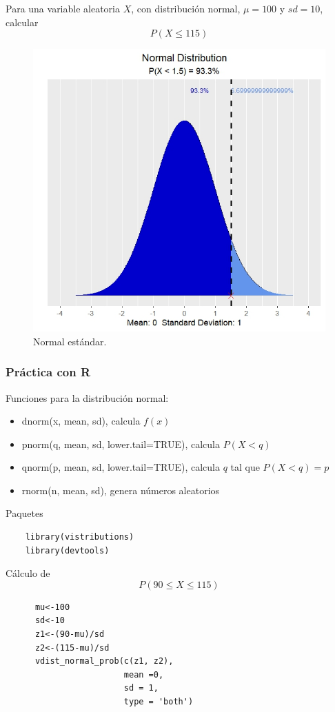 \begin{i}
Para una variable aleatoria $X$, con distribución normal, $\mu=100$ y $sd=10$, calcular
$$
P(X \leq 115)
$$
\begin{figure}[h!]
\centering
\includegraphics[scale=0.8]{Figuras/Normal2_prob.jpeg}
\caption{Normal estándar.}
\end{figure}


\subsubsection{Práctica con R}

Funciones para la distribución normal:
\begin{itemize}
\item dnorm(x, mean, sd), calcula $f(x)$
\item pnorm(q, mean, sd, lower.tail=TRUE),  calcula $P(X<q)$
\item qnorm(p, mean, sd, lower.tail=TRUE),  calcula $q$ tal que $P(X<q) = p$
\item rnorm(n, mean, sd), genera números aleatorios
\end{itemize}

\vspace{5mm}
Paquetes
\begin{lstlisting}
    library(vistributions)
    library(devtools)
\end{lstlisting}
\vspace{5mm}
Cálculo de 
$$
P(90 \leq X \leq 115)
$$
\begin{lstlisting}
      mu<-100
      sd<-10
      z1<-(90-mu)/sd
      z2<-(115-mu)/sd
      vdist_normal_prob(c(z1, z2),
                        mean =0, 
                        sd = 1,
                        type = 'both')
\end{lstlisting}


\end{i}
